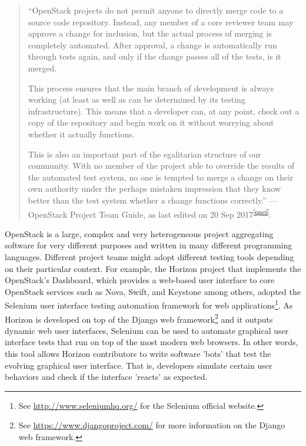 \documentclass[dvipsnames]{bmcart}
\theoremstyle{definition}
\begin{document}
\begin{quotation} 
\footnotesize

``OpenStack projects do not permit anyone to directly merge code to a source code repository. Instead, any member of a core reviewer team may approve a change for inclusion, but the actual process of merging is completely automated. After approval, a change is automatically run through tests again, and only if the change passes all of the tests, is it merged.

This process ensures that the main branch of development is always working (at least as well as can be determined by its testing infrastructure). This means that a developer can, at any point, check out a copy of the repository and begin work on it without worrying about whether it actually functions.

This is also an important part of the egalitarian structure of our community. With no member of the project able to override the results of the automated test system, no one is tempted to merge a change on their own authority under the perhaps mistaken impression that they know better than the test system whether a change functions correctly.''
--- OpenStack Project Team Guide, as last edited on 20 Sep 2017\textsuperscript{\ref{qaci}}.

\end{quotation}

 
 






OpenStack is a large, complex and very heterogeneous project aggregating software for very different purposes and written in many different programming languages. Different project teams might adopt different testing tools depending on their particular context. For example, the Horizon project that implements the OpenStack’s Dashboard, which provides a web-based user interface to core OpenStack services such as Nova, Swift, and Keystone among others, adopted the Selenium user interface testing automation framework for web applications\footnote{See \url{http://www.seleniumhq.org/} for the Selenium official website.}. As Horizon is developed on top of the  Django web framework\footnote{See \url{https://www.djangoproject.com/} for more information on the Django web framework.} and it outputs dynamic web user interfaces, Selenium can be used to automate graphical user interface tests that run on top of the most modern web browsers. In other words, this tool allows Horizon contributors to write software 'bots' that test the evolving graphical user interface. That is, developers simulate certain user behaviors and check if the interface 'reacts' as expected. 
\end{document}
